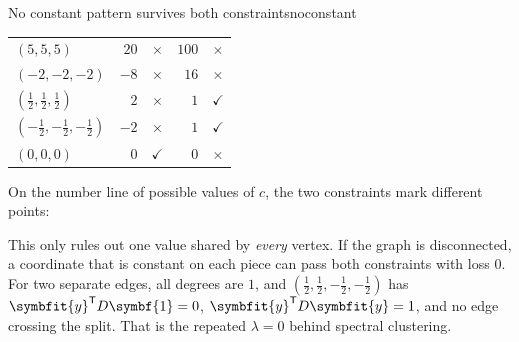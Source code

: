 \documentclass[11pt]{article}
\newcommand{\bm}[1]{\symbfit{#1}}
\newcommand{\one}{\symbf{1}}
\newcommand{\T}{^{\mathsf T}}
\begin{document}
\begin{example}{No constant pattern survives both constraints}{noconstant}
\begin{center}
\begin{tabular}{@{}lrcrc@{}}
$(5,5,5)$ & $20$ & \textcolor{thmred}{$\times$} & $100$ & \textcolor{thmred}{$\times$} \\
$(-2,-2,-2)$ & $-8$ & \textcolor{thmred}{$\times$} & $16$ & \textcolor{thmred}{$\times$} \\
$(\tfrac12,\tfrac12,\tfrac12)$ & $2$ & \textcolor{thmred}{$\times$} & $1$ & \textcolor{intgreen}{$\checkmark$} \\
$(-\tfrac12,-\tfrac12,-\tfrac12)$ & $-2$ & \textcolor{thmred}{$\times$} & $1$ & \textcolor{intgreen}{$\checkmark$} \\
$(0,0,0)$ & $0$ & \textcolor{intgreen}{$\checkmark$} & $0$ & \textcolor{thmred}{$\times$} \\
\bottomrule
\end{tabular}
\end{center}
On the number line of possible values of $c$, the two constraints mark different points:
\begin{center}
\end{center}
This only rules out one value shared by \emph{every} vertex. If the graph is disconnected, a coordinate that is constant on each piece can pass both constraints with loss $0$. For two separate edges, all degrees are $1$, and $(\tfrac12,\tfrac12,-\tfrac12,-\tfrac12)$ has $\bm y\T D\one=0$, $\bm y\T D\bm y=1$, and no edge crossing the split. That is the repeated $\lambda=0$ behind spectral clustering.
\end{example}
\end{document}
